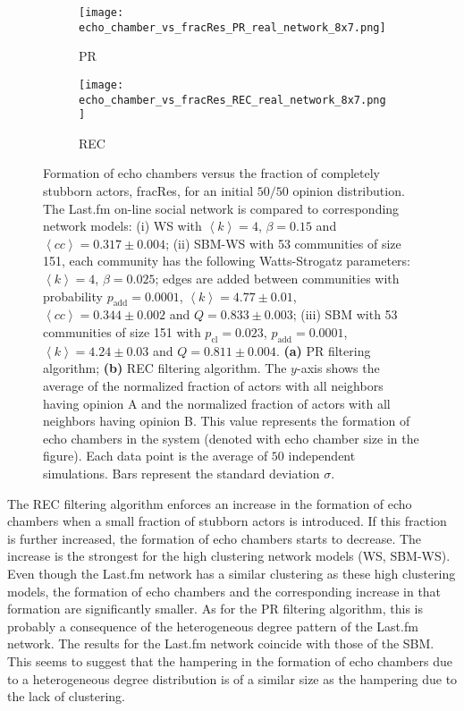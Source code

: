 \documentclass[11 pt , letterpaper , twoside , openright]{book}
\begin{document}
\begin{figure}[H]
  \begin{subfigure}[b]{0.49\textwidth}
    \caption{PR}
  	\texttt{[image: echo\_chamber\_vs\_fracRes\_PR\_real\_network\_8x7.png]}
    \label{pr_real}
  \end{subfigure}
  \begin{subfigure}[b]{0.49\textwidth}
    \caption{REC}
  	\texttt{[image: echo\_chamber\_vs\_fracRes\_REC\_real\_network\_8x7.png]}
    \label{rec_real}
  \end{subfigure}
  \captionsetup{format=plain}
  \caption[Formation of echo chambers versus fraction of completely stubborn actors for the PR and REC filtering algorithms and an initial $50/50$ opinion distribution. The Last.fm on-line social network is compared to corresponding network models.]{Formation of echo chambers versus the fraction of completely stubborn actors, fracRes, for an initial $50/50$ opinion distribution. The Last.fm on-line social network is compared to corresponding network models: (i) WS with $\left<k\right> = 4$, $\beta = 0.15$ and $\left<cc\right> = 0.317 \pm 0.004$; (ii) SBM-WS with 53 communities of size 151, each community has the following Watts-Strogatz parameters: $\left<k\right> = 4$, $\beta = 0.025$; edges are added between communities with probability $p_\text{add} = 0.0001$, $\left<k\right> = 4.77 \pm 0.01$, $\left<cc\right> = 0.344 \pm 0.002$ and $Q = 0.833 \pm 0.003$; (iii) SBM with 53 communities of size 151 with $p_\text{cl} = 0.023$, $p_\text{add} = 0.0001$, $\left<k\right> = 4.24 \pm 0.03$ and $Q = 0.811 \pm 0.004$. \textbf{(a)} PR filtering algorithm; \textbf{(b)} REC filtering algorithm. The $y$-axis shows the average of the normalized fraction of actors with all neighbors having opinion A and the normalized fraction of actors with all neighbors having opinion B. This value represents the formation of echo chambers in the system (denoted with echo chamber size in the figure). Each data point is the average of $50$ independent simulations. Bars represent the standard deviation $\sigma$.}
\label{echo_vs_fracRes_real}
\end{figure}
\noindent
The REC filtering algorithm enforces an increase in the formation of echo chambers when a small fraction of stubborn actors is introduced. If this fraction is further increased, the formation of echo chambers starts to decrease. The increase is the strongest for the high clustering network models (WS, SBM-WS). Even though the Last.fm network has a similar clustering as these high clustering models, the formation of echo chambers and the corresponding increase in that formation are significantly smaller. As for the PR filtering algorithm, this is probably a consequence of the heterogeneous degree pattern of the Last.fm network. The results for the Last.fm network coincide with those of the SBM. This seems to suggest that the hampering in the formation of echo chambers due to a heterogeneous degree distribution is of a similar size as the hampering due to the lack of clustering. 
\end{document}
